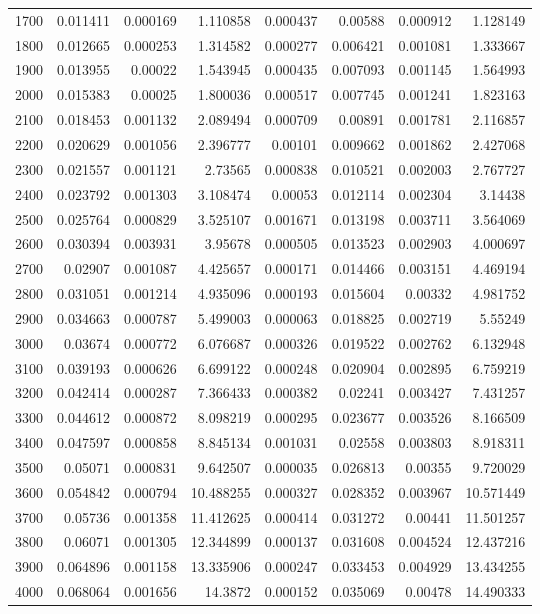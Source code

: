 \begin{longtable}{r r r r r r r r}
1700 & 0.011411 & 0.000169 & 1.110858 & 0.000437 & 0.00588 & 0.000912 & 1.128149 \\
1800 & 0.012665 & 0.000253 & 1.314582 & 0.000277 & 0.006421 & 0.001081 & 1.333667 \\
1900 & 0.013955 & 0.00022 & 1.543945 & 0.000435 & 0.007093 & 0.001145 & 1.564993 \\
2000 & 0.015383 & 0.00025 & 1.800036 & 0.000517 & 0.007745 & 0.001241 & 1.823163 \\
2100 & 0.018453 & 0.001132 & 2.089494 & 0.000709 & 0.00891 & 0.001781 & 2.116857 \\
2200 & 0.020629 & 0.001056 & 2.396777 & 0.00101 & 0.009662 & 0.001862 & 2.427068 \\
2300 & 0.021557 & 0.001121 & 2.73565 & 0.000838 & 0.010521 & 0.002003 & 2.767727 \\
2400 & 0.023792 & 0.001303 & 3.108474 & 0.00053 & 0.012114 & 0.002304 & 3.14438 \\
2500 & 0.025764 & 0.000829 & 3.525107 & 0.001671 & 0.013198 & 0.003711 & 3.564069 \\
2600 & 0.030394 & 0.003931 & 3.95678 & 0.000505 & 0.013523 & 0.002903 & 4.000697 \\
2700 & 0.02907 & 0.001087 & 4.425657 & 0.000171 & 0.014466 & 0.003151 & 4.469194 \\
2800 & 0.031051 & 0.001214 & 4.935096 & 0.000193 & 0.015604 & 0.00332 & 4.981752 \\
2900 & 0.034663 & 0.000787 & 5.499003 & 0.000063 & 0.018825 & 0.002719 & 5.55249 \\
3000 & 0.03674 & 0.000772 & 6.076687 & 0.000326 & 0.019522 & 0.002762 & 6.132948 \\
3100 & 0.039193 & 0.000626 & 6.699122 & 0.000248 & 0.020904 & 0.002895 & 6.759219 \\
3200 & 0.042414 & 0.000287 & 7.366433 & 0.000382 & 0.02241 & 0.003427 & 7.431257 \\
3300 & 0.044612 & 0.000872 & 8.098219 & 0.000295 & 0.023677 & 0.003526 & 8.166509 \\
3400 & 0.047597 & 0.000858 & 8.845134 & 0.001031 & 0.02558 & 0.003803 & 8.918311 \\
3500 & 0.05071 & 0.000831 & 9.642507 & 0.000035 & 0.026813 & 0.00355 & 9.720029 \\
3600 & 0.054842 & 0.000794 & 10.488255 & 0.000327 & 0.028352 & 0.003967 & 10.571449 \\
3700 & 0.05736 & 0.001358 & 11.412625 & 0.000414 & 0.031272 & 0.00441 & 11.501257 \\
3800 & 0.06071 & 0.001305 & 12.344899 & 0.000137 & 0.031608 & 0.004524 & 12.437216 \\
3900 & 0.064896 & 0.001158 & 13.335906 & 0.000247 & 0.033453 & 0.004929 & 13.434255 \\
4000 & 0.068064 & 0.001656 & 14.3872 & 0.000152 & 0.035069 & 0.00478 & 14.490333 \\
\end{longtable}

